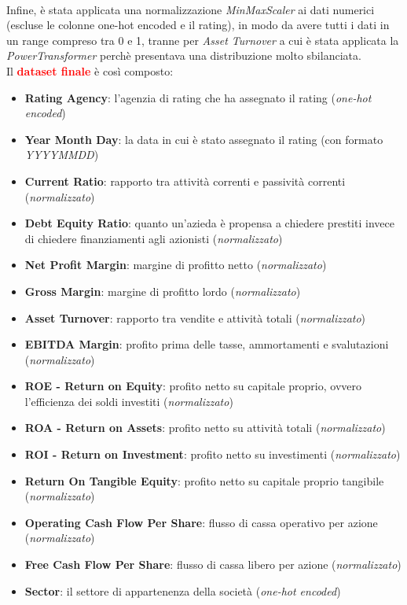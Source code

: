 \\ Infine, è stata applicata una normalizzazione \textit{MinMaxScaler} ai dati numerici (escluse le colonne one-hot encoded e il rating), in modo da avere tutti i dati in un range compreso tra 0 e 1, tranne per \textit{Asset Turnover} a cui è stata applicata la \textit{PowerTransformer} perchè presentava una distribuzione molto sbilanciata. \\ Il \textcolor{red}{\textbf{dataset finale}} è così composto:
\begin{itemize}[label=-]
    \item \textbf{Rating Agency}: l'agenzia di rating che ha assegnato il rating (\textit{one-hot encoded})
    \item \textbf{Year Month Day}: la data in cui è stato assegnato il rating (con formato \textit{YYYYMMDD})
    \item \textbf{Current Ratio}: rapporto tra attività correnti e passività correnti (\textit{normalizzato})
    \item \textbf{Debt Equity Ratio}: quanto un'azieda è propensa a chiedere prestiti invece di chiedere finanziamenti agli azionisti (\textit{normalizzato})
    \item \textbf{Net Profit Margin}: margine di profitto netto (\textit{normalizzato})
    \item \textbf{Gross Margin}: margine di profitto lordo (\textit{normalizzato})
    \item \textbf{Asset Turnover}: rapporto tra vendite e attività totali (\textit{normalizzato})
    \item \textbf{EBITDA Margin}: profito prima delle tasse, ammortamenti e svalutazioni (\textit{normalizzato})
    \item \textbf{ROE - Return on Equity}: profito netto su capitale proprio, ovvero l'efficienza dei soldi investiti (\textit{normalizzato})
    \item \textbf{ROA - Return on Assets}: profito netto su attività totali (\textit{normalizzato})
    \item \textbf{ROI - Return on Investment}: profito netto su investimenti (\textit{normalizzato})
    \item \textbf{Return On Tangible Equity}: profito netto su capitale proprio tangibile (\textit{normalizzato})
    \item \textbf{Operating Cash Flow Per Share}: flusso di cassa operativo per azione (\textit{normalizzato})
    \item \textbf{Free Cash Flow Per Share}: flusso di cassa libero per azione (\textit{normalizzato})
    \item \textbf{Sector}: il settore di appartenenza della società (\textit{one-hot encoded})
\end{itemize}
